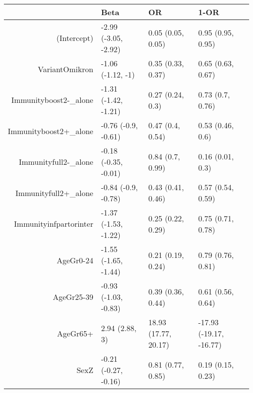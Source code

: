 \begin{table}[ht]
\centering
\begin{tabular}{rlll}
  \hline
 & Beta & OR & 1-OR \\ 
  \hline
(Intercept) & -2.99 (-3.05, -2.92) & 0.05 (0.05, 0.05) & 0.95 (0.95, 0.95) \\ 
  VariantOmikron & -1.06 (-1.12, -1) & 0.35 (0.33, 0.37) & 0.65 (0.63, 0.67) \\ 
  Immunityboost2-\_alone & -1.31 (-1.42, -1.21) & 0.27 (0.24, 0.3) & 0.73 (0.7, 0.76) \\ 
  Immunityboost2+\_alone & -0.76 (-0.9, -0.61) & 0.47 (0.4, 0.54) & 0.53 (0.46, 0.6) \\ 
  Immunityfull2-\_alone & -0.18 (-0.35, -0.01) & 0.84 (0.7, 0.99) & 0.16 (0.01, 0.3) \\ 
  Immunityfull2+\_alone & -0.84 (-0.9, -0.78) & 0.43 (0.41, 0.46) & 0.57 (0.54, 0.59) \\ 
  Immunityinfpartorinter & -1.37 (-1.53, -1.22) & 0.25 (0.22, 0.29) & 0.75 (0.71, 0.78) \\ 
  AgeGr0-24 & -1.55 (-1.65, -1.44) & 0.21 (0.19, 0.24) & 0.79 (0.76, 0.81) \\ 
  AgeGr25-39 & -0.93 (-1.03, -0.83) & 0.39 (0.36, 0.44) & 0.61 (0.56, 0.64) \\ 
  AgeGr65+ & 2.94 (2.88, 3) & 18.93 (17.77, 20.17) & -17.93 (-19.17, -16.77) \\ 
  SexZ & -0.21 (-0.27, -0.16) & 0.81 (0.77, 0.85) & 0.19 (0.15, 0.23) \\ 
   \hline
\end{tabular}
\end{table}
